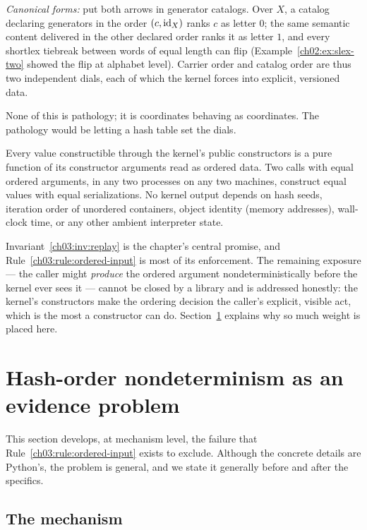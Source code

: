 \emph{Canonical forms:} put both arrows in generator catalogs. Over
$X$, a catalog declaring generators in the order
$(c, \mathrm{id}_X)$ ranks $c$ as letter $0$; the same semantic content
delivered in the other declared order ranks it as letter $1$, and every
shortlex tiebreak between words of equal length can flip
(Example~\ref{ch02:ex:slex-two} showed the flip at alphabet level).
Carrier order and catalog order are thus two independent dials, each of
which the kernel forces into explicit, versioned data.

None of this is pathology; it is coordinates behaving as coordinates.
The pathology would be letting a hash table set the dials.

\begin{invariant}\label{ch03:inv:replay}
Every value constructible through the kernel's public constructors is a
pure function of its constructor arguments read as ordered data. Two calls
with equal ordered arguments, in any two processes on any two machines,
construct equal values with equal serializations. No kernel output depends
on hash seeds, iteration order of unordered containers, object identity
(memory addresses), wall-clock time, or any other ambient interpreter
state.
\end{invariant}

Invariant~\ref{ch03:inv:replay} is the chapter's central promise, and
Rule~\ref{ch03:rule:ordered-input} is most of its enforcement. The
remaining exposure --- the caller might \emph{produce} the ordered argument
nondeterministically before the kernel ever sees it --- cannot be closed by
a library and is addressed honestly: the kernel's constructors make the
ordering decision the caller's explicit, visible act, which is the most a
constructor can do. Section~\ref{ch03:sec:hash-order} explains why so much
weight is placed here.

\section{Hash-order nondeterminism as an evidence problem}\label{ch03:sec:hash-order}

This section develops, at mechanism level, the failure that
Rule~\ref{ch03:rule:ordered-input} exists to exclude. Although the concrete
details are Python's, the problem is general, and we state it generally
before and after the specifics.

\subsection{The mechanism}

